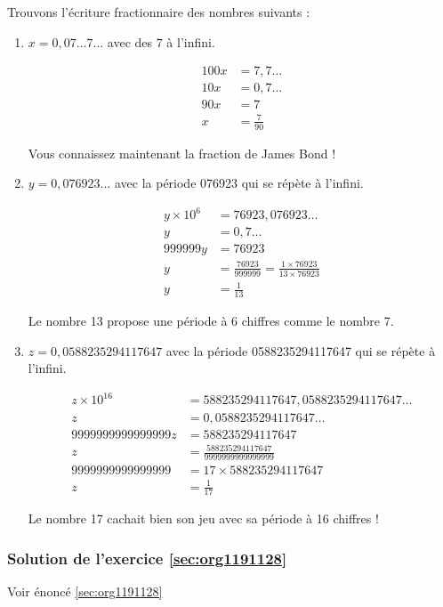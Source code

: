 \documentclass[a4paper, 11pt, twoside]{article}
\begin{document}
Trouvons l'écriture fractionnaire des nombres suivants :
\begin{enumerate}
\item \(x = 0,07\dots7\dots\) avec des \(7\) à l'infini.

\begin{align*}
100x &= 7,7\dots\\
10x  &= 0,7\dots\\
90x &= 7\\
   x &= \frac{7}{90} 
\end{align*}

Vous connaissez maintenant la fraction de James Bond !
\item \(y = 0,076923\dots\) avec la période 076923 qui se répète à
l'infini.

\begin{align*}
y \times 10^6 &= 76923,076923\dots\\
y  &= 0,7\dots\\
999999y &= 76923\\
   y &= \frac{76923}{999999} = \frac{1\times 76923}{13\times 76923} \\
   y &= \frac{1}{13}
\end{align*}

Le nombre 13 propose une période à 6 chiffres comme le nombre 7.
\item \(z = 0,0588235294117647\) avec la période 0588235294117647 qui
se répète à l'infini.

\begin{align*}
z\times 10^{16} &= 588235294117647,0588235294117647\dots\\
z  &= 0,0588235294117647\dots\\
9999999999999999z &= 588235294117647\\
   z &= \frac{588235294117647}{9999999999999999}\\
   9999999999999999 &= 17\times 588235294117647 \\ 
   z &= \frac{1}{17}
\end{align*}

Le nombre 17 cachait bien son jeu avec sa période à 16 chiffres !
\end{enumerate}
\subsubsection{Solution de l'exercice \ref{sec:org1191128}}
\label{sec:orgcc2452d}
Voir énoncé \ref{sec:org1191128}
\end{document}
